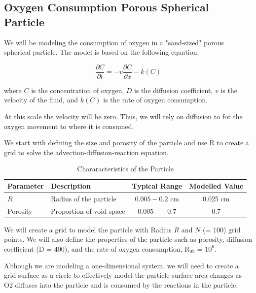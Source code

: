 \documentclass{tufte-handout}\usepackage[]{graphicx}\usepackage[]{xcolor}
\begin{document}
\subsection{Oxygen Consumption Porous Spherical Particle}

We will be modeling the consumption of oxygen in a "sand-sized" porous spherical particle. The model is based on the following equation:

\[ \frac{\partial C}{\partial t} = -v \frac{\partial C}{\partial x} - k(C) \]

where \( C \) is the concentration of oxygen, \( D \) is the diffusion coefficient, \( v \) is the velocity of the fluid, and \( k(C) \) is the rate of oxygen consumption.

At this scale the velocity will be zero. Thus, we will rely on diffusion to for the oxygen movement to where it is consumed. 



We start with defining the size and porosity of the particle and use R to create a grid to solve the advection-diffusion-reaction equation.

\begin{table}[h]
\caption{Chararacteristics of the Particle}
\centering
\begin{tabular}{|l|l|c|c|} \hline
Parameter & Description & Typical Range &  Modelled Value \\ \hline\hline
\( R \) & Radius of the particle & \( 0.005 - 0.2 \) cm &  0.025 cm \\
Porosity & Proportion of void space & \(0.005 -- 0.7\) &  0.7 \\ \hline
\end{tabular}
\end{table}

We will create a grid to model the particle with Radius \( R \) and \( N \) (= 100) grid points. We will also define the properties of the particle such as porosity, diffusion coefficient (D = 400), and the rate of oxygen consumption, R$_{02}$ = \ensuremath{10^{6}}.

Although we are modeling a one-dimensional system, we will need to create a grid surface as a circle to effectively model the particle surface area changes as O2 diffuses into the particle and is consumed by the reactions in the particle.
\end{document}
